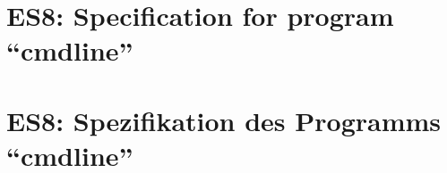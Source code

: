 \parindent0pt

\thispagestyle{empty}
\ifenglish
\section*{ES8: Specification for program ``cmdline''}

\fi
\ifgerman
\section*{ES8: Spezifikation des Programms ``cmdline''}

\fi


